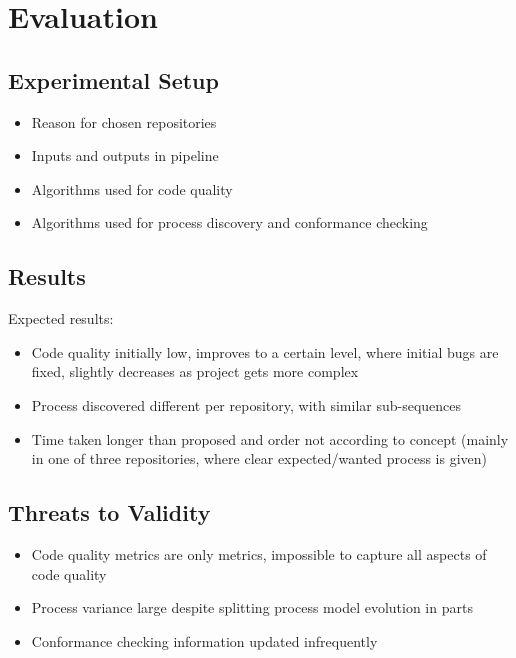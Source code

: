 \chapter{Evaluation}
\label{chap:eval}


\section{Experimental Setup}
\begin{itemize}
	\item Reason for chosen repositories
	\item Inputs and outputs in pipeline
	\item Algorithms used for code quality
	\item Algorithms used for process discovery and conformance checking
\end{itemize}

\section{Results}
Expected results:
\begin{itemize}
	\item Code quality initially low, improves to a certain level, where initial bugs are fixed, slightly decreases as project gets more complex
	\item Process discovered different per repository, with similar sub-sequences
	\item Time taken longer than proposed and order not according to concept (mainly in one of three repositories, where clear expected/wanted process is given)
\end{itemize}

\section{Threats to Validity}
\begin{itemize}
	\item Code quality metrics are only metrics, impossible to capture all aspects of code quality
	\item Process variance large despite splitting process model evolution in parts
	\item Conformance checking information updated infrequently
\end{itemize}
